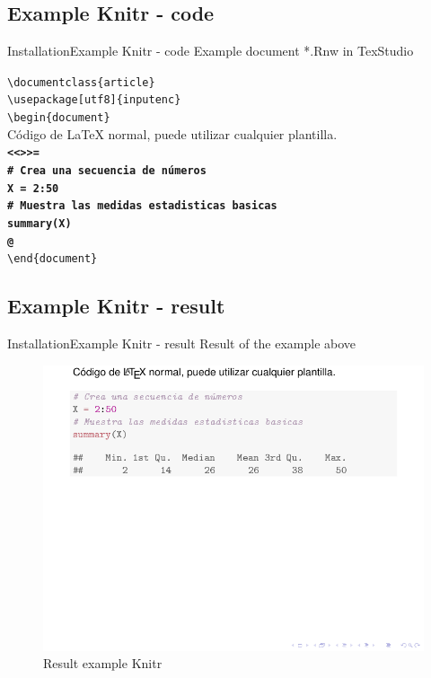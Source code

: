 \documentclass[10pt]{beamer}
\begin{document}
\subsection{Example Knitr - code}
\begin{frame}{Installation}{Example Knitr - code}
	Example document *.Rnw in TexStudio
	
	{\tt \textbackslash documentclass\{article\}}\\
	{\tt \textbackslash usepackage[utf8]\{inputenc\}}\\
	{\tt \textbackslash begin\{document\}}\\
	Código de \LaTeX{} normal, puede utilizar cualquier plantilla.\\
	{\tt \textbf{<<>>=}}\\	
	{\tt \textbf{\# Crea una secuencia de números}}\\
	{\tt \textbf{X = 2:50}}\\
	{\tt \textbf{\# Muestra las medidas estadisticas basicas}}\\
	{\tt \textbf{summary(X)}}\\
	{\tt \textbf{@}}\\
	{\tt \textbackslash end\{document\}}\\
\end{frame}

\subsection{Example Knitr - result}
\begin{frame}{Installation}{Example Knitr - result}
	\vspace{1cm}
	Result of the example above
	\begin{figure}[H] 
		\begin{flushleft}
		\includegraphics[width=1\textwidth]{./Rnw/document}
		\caption{Result example Knitr}
		\label{DCP}
		\end{flushleft}
	\end{figure}
\end{frame}
\end{document}
